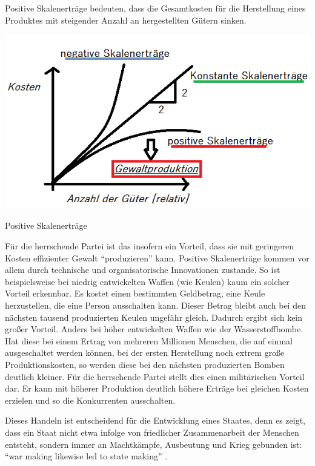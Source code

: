 Positive Skalenerträge bedeuten, dass die Gesamtkosten für die Herstellung eines Produktes mit steigender Anzahl an hergestellten Gütern sinken.

\begin{dsafigure}
	\begin{center}
	\includegraphics[width=0.9\columnwidth]{img/Skalenertraege.png}
	\caption{Positive Skalenerträge}
	\label{fig:skalenertraege}
	\end{center}
\end{dsafigure}

Für die herrschende Partei ist das insofern ein Vorteil, dass sie mit geringeren Kosten effizienter Gewalt ``produzieren'' kann.
Positive Skalenerträge kommen vor allem durch technische und organisatorische Innovationen zustande.
So ist beispielsweise bei niedrig entwickelten Waffen (wie Keulen) kaum ein solcher Vorteil erkennbar.
Es kostet einen bestimmten Geldbetrag, eine Keule herzustellen, die eine Person ausschalten kann.
Dieser Betrag bleibt auch bei den nächsten tausend produzierten Keulen ungefähr gleich.
Dadurch ergibt sich kein großer Vorteil.
Anders bei höher entwickelten Waffen wie der Wasserstoffbombe.
Hat diese bei einem Ertrag von mehreren Millionen Menschen, die auf einmal ausgeschaltet werden können, bei der ersten Herstellung noch extrem große Produktionskosten, so werden diese bei den nächsten produzierten Bomben deutlich kleiner.
Für die herrschende Partei stellt dies einen militärischen Vorteil dar.
Er kann mit höherer Produktion deutlich höhere Erträge bei gleichen Kosten erzielen und so die Konkurrenten ausschalten.

Dieses Handeln ist entscheidend für die Entwicklung eines Staates, denn es zeigt, dass ein Staat nicht etwa infolge von friedlicher Zusammenarbeit der Menschen entsteht, sondern immer an Machtkämpfe, Ausbeutung und Krieg gebunden ist: ``war making likewise led to state making'' \parencite[183]{Tilly-1985-aa}.

